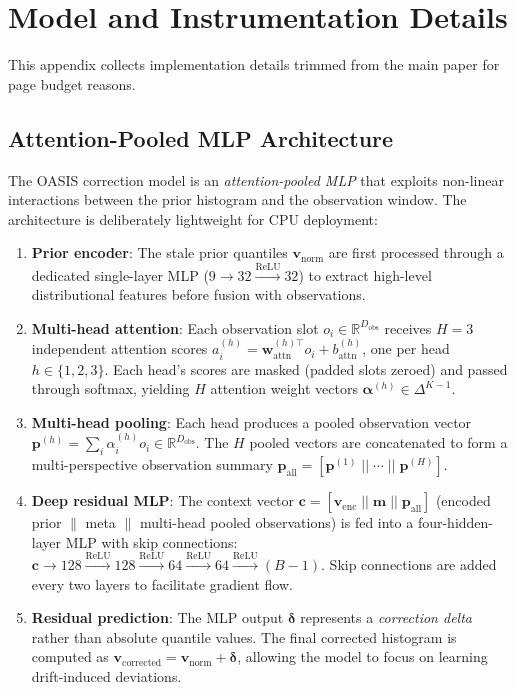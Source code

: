 \section{Model and Instrumentation Details}
\label{sec:system-details-app}

This appendix collects implementation details trimmed from the main paper for
page budget reasons.

\subsection{Attention-Pooled MLP Architecture}

The OASIS correction model is an \emph{attention-pooled MLP} that exploits
non-linear interactions between the prior histogram and the observation window.
The architecture is deliberately lightweight for CPU deployment:

\begin{enumerate}
  \item \textbf{Prior encoder}: The stale prior quantiles $\mathbf{v}_{\text{norm}}$
        are first processed through a dedicated single-layer MLP
        ($9 \to 32 \xrightarrow{\text{ReLU}} 32$) to extract high-level
        distributional features before fusion with observations.
  \item \textbf{Multi-head attention}: Each observation slot $o_i \in \mathbb{R}^{D_{\text{obs}}}$
        receives $H{=}3$ independent attention scores
        $a_i^{(h)} = \mathbf{w}_{\text{attn}}^{(h)\top} o_i + b_{\text{attn}}^{(h)}$,
        one per head $h \in \{1,2,3\}$.
        Each head's scores are masked (padded slots zeroed) and passed through softmax,
        yielding $H$ attention weight vectors $\boldsymbol{\alpha}^{(h)} \in \Delta^{K-1}$.
  \item \textbf{Multi-head pooling}: Each head produces a pooled observation vector
        $\mathbf{p}^{(h)} = \sum_{i} \alpha_i^{(h)} o_i \in \mathbb{R}^{D_{\text{obs}}}$.
        The $H$ pooled vectors are concatenated to form a multi-perspective
        observation summary $\mathbf{p}_{\text{all}} = [\mathbf{p}^{(1)} \;||\; \cdots \;||\; \mathbf{p}^{(H)}]$.
  \item \textbf{Deep residual MLP}: The context vector
        $\mathbf{c} = [\mathbf{v}_{\text{enc}} \;||\; \mathbf{m} \;||\; \mathbf{p}_{\text{all}}]$
        (encoded prior $\|$ meta $\|$ multi-head pooled observations)
        is fed into a four-hidden-layer MLP with skip connections:
        $\mathbf{c} \to 128 \xrightarrow{\text{ReLU}} 128 \xrightarrow{\text{ReLU}} 64 \xrightarrow{\text{ReLU}} 64 \xrightarrow{\text{ReLU}} (B{-}1)$.
        Skip connections are added every two layers to facilitate gradient flow.
  \item \textbf{Residual prediction}: The MLP output $\boldsymbol{\delta}$ represents
        a \emph{correction delta} rather than absolute quantile values.
        The final corrected histogram is computed as
        $\mathbf{v}_{\text{corrected}} = \mathbf{v}_{\text{norm}} + \boldsymbol{\delta}$,
        allowing the model to focus on learning drift-induced deviations.
\end{enumerate}


